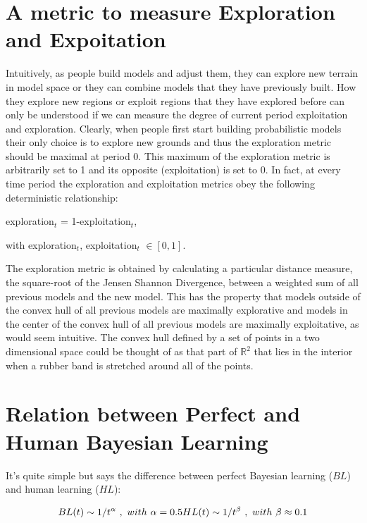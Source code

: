 \documentclass{article}
\begin{document}
\section{A metric to measure Exploration and Expoitation}

Intuitively, as people build models and adjust them, they can explore new terrain in model space or they can combine models that they have previously built. How they explore new regions or exploit regions that they have explored before can only be understood if we can measure the degree of current period exploitation and exploration.  Clearly, when people first start building probabilistic models their only choice is to explore new grounds and thus the exploration metric should be maximal at period 0.  This maximum of the exploration metric is arbitrarily set to 1 and its opposite (exploitation) is set to 0.  In fact, at every time period the exploration and exploitation metrics obey the following deterministic relationship: 

exploration$_t$ = 1-exploitation$_t$, 

with exploration$_t$, exploitation$_t$ $\in [0, 1]$. 

The exploration metric is obtained by calculating a particular distance measure, the square-root of the Jensen Shannon Divergence, between a weighted sum of all previous models and the new model. This has the property that models outside of the convex hull of all previous models are maximally explorative and models in the center of the convex hull of all previous models are maximally exploitative, as would seem intuitive.  The convex hull defined by a set of points in a two dimensional space could be thought of as that part of $\mathbb{R}^2$ that lies in the interior when a rubber band is stretched around all of the points. 

\section{Relation between Perfect and Human Bayesian Learning}
It's quite simple but says the difference between perfect Bayesian learning ($BL$) and human learning ($HL$):

\begin{equation}
BL(t) \sim 1/t^{\alpha}~,~with~\alpha = 0.5\\
HL(t) \sim 1/t^{\beta}~,~with~\beta \approx 0.1\\
\label{BHL}
\end{equation}
 
\end{document}
